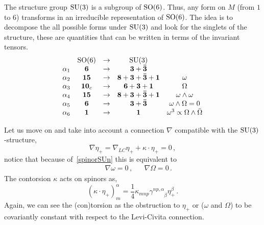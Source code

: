 \documentclass[debug]{phd}
\begin{document}
				The structure group $\mathrm{SU}(3)$ is a subgroup of $\mathrm{SO}(6)$.
				Thus, any form on $M$ (from $1$ to $6$) transforms in an irreducible representation of $\mathrm{SO}(6)$.
				The idea is to decompose the all possible forms under $\mathrm{SU}(3)$ and look for the singlets of the structure, these are quantities that can be written in terms of the invariant tensors.
						\begin{equation*}
							\begin{array}{lcrcc}
										&		\mathrm{SO}(6)		&	\rightarrow	&	\mathrm{SU}(3)										&								\\
								\alpha_1	&	\mathbf{6}			&	\rightarrow	&	\mathbf{3} + \mathbf{\bar{3}}						&								\\
								\alpha_2	&	\mathbf{15}		&	\rightarrow	&	\mathbf{8} + \mathbf{3} + \mathbf{\bar{3}} +\mathbf{1}	&	\omega						\\
								\alpha_3	&	\mathbf{10}_c		&	\rightarrow	&	\mathbf{6} + \mathbf{3} + \mathbf{1}					&	\Omega						\\
								\alpha_4	&	\mathbf{15}		&	\rightarrow	&	\mathbf{8} + \mathbf{3} + \mathbf{\bar{3}} +\mathbf{1}	&	\omega \wedge \omega 			\\
								\alpha_5	&	\mathbf{6}			&	\rightarrow	&	\mathbf{3} + \mathbf{\bar{3}}						&	\omega \wedge \Omega = 0		\\
								\alpha_6	&	\mathbf{1}			&	\rightarrow	&	\mathbf{1} 									&	\omega^3 \propto \Omega \wedge \bar{\Omega}
							\end{array}
						\end{equation*}
				
				Let us move on and take into account a connection $\nabla$ compatible with the $\mathrm{SU}(3)$-structure,
						\begin{equation}\label{covdereta}
							\nabla \eta_+ = \nabla_{LC} \eta_+  + \kappa \cdot \eta_+ = 0\, ,
						\end{equation}
				notice that because of~\eqref{spinorSUn} this is equivalent to 
						\begin{align}
							 & &	& & \nabla \omega = 0 \, , & & \nabla \Omega = 0 \, . & & 
						\end{align}
				The contorsion $\kappa$ acts on spinors as,
						\begin{equation}
							(\kappa \cdot \eta_+)_{m}^{\alpha} = \frac{1}{4} \kappa_{mnp} \gamma^{np, \alpha}_{\phantom{np,\alpha}\beta} \eta_{+}^\beta \, .
						\end{equation}
				Again, we can see the (con)torsion as the obstruction to $\eta_+$ or ($\omega$ and $\Omega$) to be covariantly constant with respect to the Levi-Civita connection.
				
\end{document}
